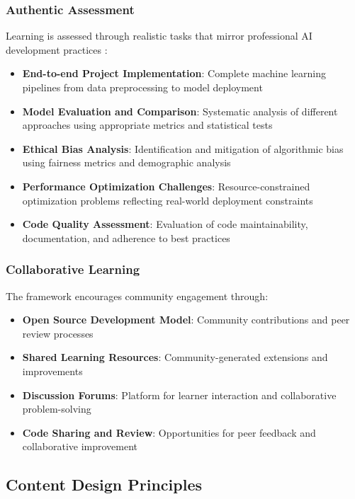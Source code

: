 \subsubsection{Authentic Assessment}

Learning is assessed through realistic tasks that mirror professional AI development practices \cite{herrington2006authentic}:
\begin{itemize}
    \item \textbf{End-to-end Project Implementation}: Complete machine learning pipelines from data preprocessing to model deployment
    \item \textbf{Model Evaluation and Comparison}: Systematic analysis of different approaches using appropriate metrics and statistical tests
    \item \textbf{Ethical Bias Analysis}: Identification and mitigation of algorithmic bias using fairness metrics and demographic analysis
    \item \textbf{Performance Optimization Challenges}: Resource-constrained optimization problems reflecting real-world deployment constraints
    \item \textbf{Code Quality Assessment}: Evaluation of code maintainability, documentation, and adherence to best practices
\end{itemize}

\subsubsection{Collaborative Learning}

The framework encourages community engagement through:
\begin{itemize}
    \item \textbf{Open Source Development Model}: Community contributions and peer review processes
    \item \textbf{Shared Learning Resources}: Community-generated extensions and improvements
    \item \textbf{Discussion Forums}: Platform for learner interaction and collaborative problem-solving
    \item \textbf{Code Sharing and Review}: Opportunities for peer feedback and collaborative improvement
\end{itemize}

\subsection{Content Design Principles}

